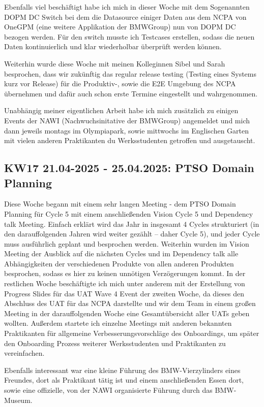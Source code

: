 Ebenfalls viel beschäftigt habe ich mich in dieser Woche mit dem Sogenannten \ac{DOPM DC} Switch bei dem die Datasource einiger Daten aus dem \ac{NCPA} von \ac{OneGPM} (eine weitere Applikation der BMWGroup) nun von \ac{DOPM DC} bezogen werden. 
Für den switch musste ich Testcases erstellen, sodass die neuen Daten kontinuierlich und klar wiederholbar überprüft werden können.

Weiterhin wurde diese Woche mit meinen Kolleginnen Sibel und Sarah besprochen, dass wir zukünftig das regular release testing (Testing eines Systems kurz vor Release) für die Produktiv-, sowie die \ac{E2E} Umgebung des \ac{NCPA} übernehmen und dafür auch schon erste Termine eingestellt und wahrgenommen.

Unabhängig meiner eigentlichen Arbeit habe ich mich zusätzlich zu einigen Events der \ac{NAWI} (Nachwuchsinitative der BMWGroup) angemeldet und mich dann jeweils montags im Olympiapark, sowie mittwochs im Englischen Garten mit vielen anderen Praktikanten du Werksstudenten getroffen und ausgetauscht.


\subsection{KW17 21.04-2025 - 25.04.2025: PTSO Domain Planning}
Diese Woche begann mit einem sehr langen Meeting - dem PTSO Domain Planning für Cycle 5 mit einem anschließenden Vision Cycle 5 und Dependency talk Meeting. 
Einfach erklärt wird das Jahr in insgesamt 4 Cycles strukturiert (in den darauffolgenden Jahren wird weiter gezählt – daher Cycle 5), und jeder Cycle muss ausführlich geplant und besprochen werden. 
Weiterhin wurden im Vision Meeting der Ausblick auf die nächsten Cycles und im Dependency talk alle Abhängigkeiten der verschiedenen Produkte von allen anderen Produkten besprochen, sodass es hier zu keinen unnötigen Verzögerungen kommt. 
In der restlichen Woche beschäftigte ich mich unter anderem mit der Erstellung von Progress Slides für das \ac{UAT} Wave 4 Event der zweiten Woche, da dieses den Abschluss des \ac{UAT} für das \ac{NCPA} darstellte und wir dem Team in einem großen Meeting in der darauffolgenden Woche eine Gesamtübersicht aller \acp{UAT} geben wollten. 
Außerdem startete ich einzelne Meetings mit anderen bekannten Praktikanten für allgemeine Verbesserungsvorschläge des Onboardings, um später den Onboarding Prozess weiterer Werksstudenten und Praktikanten zu vereinfachen.

Ebenfalls interessant war eine kleine Führung des BMW-Vierzylinders eines Freundes, dort als Praktikant tätig ist und einem anschließenden Essen dort, sowie eine offizielle, von der \ac{NAWI} organisierte Führung durch das BMW-Museum.

